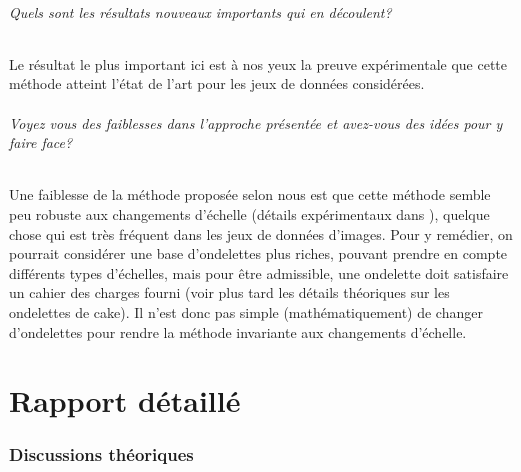 \documentclass{article}
\begin{document}
\paragraph{Quels sont les résultats nouveaux importants qui en découlent?}
Le résultat le plus important ici est à nos yeux la preuve expérimentale que cette
méthode atteint l'état de l'art pour les jeux de données considérées.
\paragraph{Voyez vous des faiblesses dans l'approche présentée et avez-vous des idées
pour y faire face?}
Une faiblesse de la méthode proposée selon nous est que cette méthode semble peu robuste
aux changements d'échelle (détails expérimentaux dans \ref{part:details}), quelque chose qui est très fréquent dans les jeux de données
d'images. Pour y remédier, on pourrait considérer une base d'ondelettes plus riches,
pouvant prendre en compte différents types d'échelles, mais pour être admissible, une
ondelette doit satisfaire un cahier des charges fourni (voir plus tard les détails
théoriques sur les ondelettes de cake).  Il n'est donc pas simple (mathématiquement) de
changer d'ondelettes pour rendre la méthode invariante aux changements d'échelle.

\part{Rapport détaillé}\label{part:details}
\section{Discussions théoriques}
\end{document}
